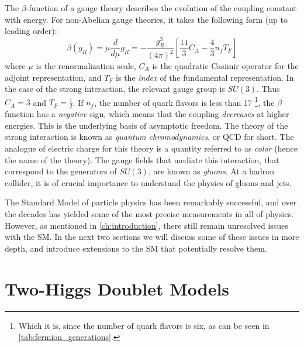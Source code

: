 The $\beta$-function of a gauge theory describes the evolution of the coupling constant with energy. For non-Abelian gauge theories, it takes the following form (up to leading order):%
\begin{equation}
  \beta(g_R) = \mu\frac{d}{d\mu}g_R = -\frac{g_R^3}{(4\pi)^2}\left[\frac{11}{3}C_A -\frac{4}{3}n_fT_F\right]
\end{equation}
where $\mu$ is the renormalization scale, $C_A$ is the quadratic Casimir operator for the adjoint representation, and $T_F$ is the \emph{index} of the fundamental representation.
In the case of the strong interaction, the relevant gauge group is $SU(3)$. Thus $C_A = 3$ and $T_F = \frac{1}{2}$. If $n_f$, the number of quark flavors is less than 17 \footnote{Which it is, since the number of quark flavors is six, as can be seen in \autoref{tab:fermion_generations}.}, the $\beta$ function has a \emph{negative} sign, which means that the coupling \emph{decreases} at higher energies. This is the underlying basis of asymptotic freedom. The theory of the strong interaction is known as \emph{quantum chromodynamics}, or QCD for short. The analogue of electric charge for this theory is a quantity referred to as \emph{color} (hence the name of the theory). The gauge fields that mediate this interaction, that correspond to the generators of $SU(3)$, are known as \emph{gluons}. At a hadron collider, it is of crucial importance to understand the physics of gluons and jets.

The Standard Model of particle physics has been remarkably successful, and over the decades has yielded some of the most precise measurements in all of physics. However, as mentioned in \autoref{ch:introduction}, there still remain unresolved issues with the SM. In the next two sections we will discuss some of these issues in more depth, and introduce extensions to the SM that potentially resolve them.

\section{Two-Higgs Doublet Models}\label{sec:2HDMs}

